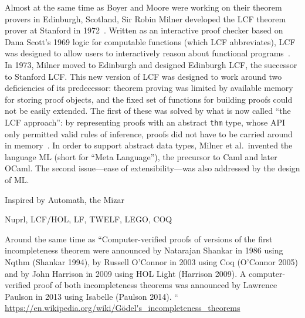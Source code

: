 Almost at the same time as Boyer and Moore were working on their theorem provers in Edinburgh, Scotland, Sir Robin Milner developed the LCF theorem prover at Stanford in 1972~\cite[p.~1]{LCF2000Gordon}.
Written as an interactive proof checker based on Dana Scott's 1969 logic for computable functions (which LCF abbreviates), LCF was designed to allow users to interactively reason about functional programs~\cite[p.~1]{LCF2000Gordon}.
In 1973, Milner moved to Edinburgh and designed Edinburgh LCF, the successor to Stanford LCF.
This new version of LCF was designed to work around two deficiencies of its predecessor: theorem proving was limited by available memory for storing proof objects, and the fixed set of functions for building proofs could not be easily extended.
The first of these was solved by what is now called ``the LCF approach'': by representing proofs with an abstract \texttt{thm} type, whose API only permitted valid rules of inference, proofs did not have to be carried around in memory~\cite[pp.~1--2]{LCF2000Gordon}.
In order to support abstract data types, Milner et al.~invented the language ML (short for ``Meta Language'')\cite[p.~2]{LCF2000Gordon}, the precursor to Caml and later OCaml.
The second issue---ease of extensibility---was also addressed by the design of ML\cite[p.~2]{LCF2000Gordon}.



Inspired by Automath, the Mizar~\cite{Rudnicki92anoverview,Matuszewski05mizar:the}

Nuprl, LCF/HOL, LF, TWELF, LEGO, COQ

Around the same time as
``Computer-verified proofs of versions of the first incompleteness theorem were announced by Natarajan Shankar in 1986 using Nqthm (Shankar 1994), by Russell O'Connor in 2003 using Coq (O'Connor 2005) and by John Harrison in 2009 using HOL Light (Harrison 2009). A computer-verified proof of both incompleteness theorems was announced by Lawrence Paulson in 2013 using Isabelle (Paulson 2014). `` \url{https://en.wikipedia.org/wiki/Gödel's_incompleteness_theorems}



